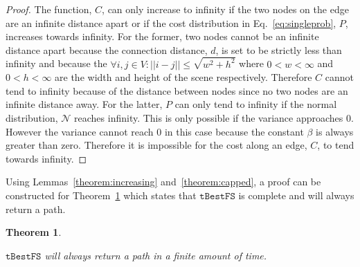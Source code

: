 \documentclass[letterpaper, 10pt, conference]{ieeeconf}
\newcommand{\Acronym}[1]{\ensuremath{{{\texttt{#1}}}}}
\newtheorem{theorem}{Theorem}
\begin{document}
\begin{proof}

    The function, $C$, can only increase to infinity if the two nodes on the
    edge are an infinite distance apart or if the cost distribution in
    Eq.~\ref{eq:singleprob}, $P$, increases towards infinity. For the former,
    two nodes cannot be an infinite distance apart because the connection
    distance, $d$, is set to be strictly less than infinity and because the
    $\forall i, j \in V : ||i - j|| \leq \sqrt{w^2 + h^2}$ where $0 < w <
    \infty$ and $0 < h < \infty$ are the width and height of the scene
    respectively. Therefore $C$ cannot tend to infinity because of the distance
    between nodes since no two nodes are an infinite distance away. For the
    latter, $P$ can only tend to infinity if the normal distribution,
    $\mathcal{N}$ reaches infinity. This is only possible if the variance
    approaches 0. However the variance cannot reach $0$ in this case because
    the constant $\beta$ is always greater than zero. Therefore it is
    impossible for the cost along an edge, $C$, to tend towards infinity.

\end{proof}

Using Lemmas~\ref{theorem:increasing} and~\ref{theorem:capped}, a proof can be
constructed for Theorem~\ref{theorem:completeness} which states that
$\Acronym{tBestFS}$ is complete and will always return a path.

\begin{theorem}

    \label{theorem:completeness}

    $\Acronym{tBestFS}$ will always return a path in a finite amount of time.

\end{theorem}
\end{document}
